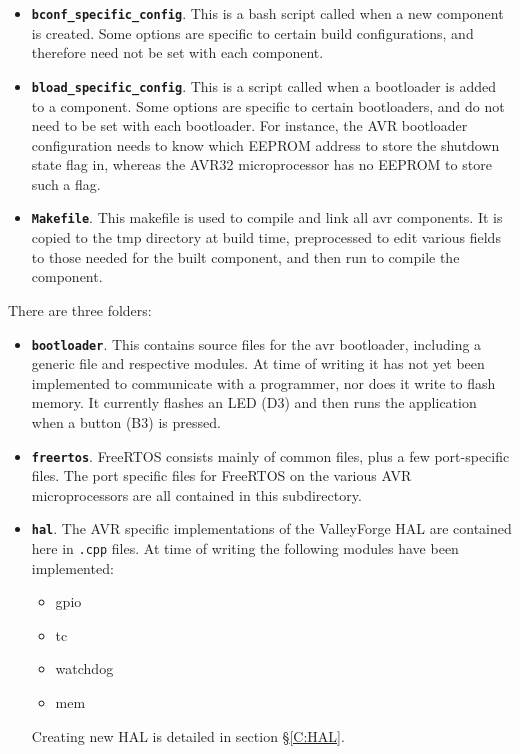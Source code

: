 \documentclass[a4paper, oneside, 11pt, titlepage, onecolumn, openright]{report}
\begin{document}
\begin{itemize}

\item \textbf{\texttt{bconf\_specific\_config}}. This is a bash script called when a new component is created. Some options are specific to certain build configurations, and therefore need not be set with each component. 

\item \textbf{\texttt{bload\_specific\_config}}. This is a script called when a bootloader is added to a component. Some options are specific to certain bootloaders, and do not need to be set with each bootloader. For instance, the AVR bootloader configuration needs to know which EEPROM address to store the shutdown state flag in, whereas the AVR32 microprocessor has no EEPROM to store such a flag.

\item \textbf{\texttt{Makefile}}. This makefile is used to compile and link all avr components. It is copied to the tmp directory at build time, preprocessed to edit various fields to those needed for the built component, and then run to compile the component.

\end{itemize}					

There are three folders:

\begin{itemize}

\item \textbf{\texttt{bootloader}}. This contains source files for the avr bootloader, including a generic file and respective modules. At time of writing it has not yet been implemented to communicate with a programmer, nor does it write to flash memory. It currently flashes an LED (D3) and then runs the application when a button (B3) is pressed.

\item \textbf{\texttt{freertos}}. FreeRTOS consists mainly of common files, plus a few port-specific files. The port specific files for FreeRTOS on the various AVR microprocessors are all contained in this subdirectory.

\item \textbf{\texttt{hal}}. The AVR specific implementations of the ValleyForge HAL are contained here in \texttt{.cpp} files. At time of writing the following modules have been implemented:
\begin{itemize}
\item gpio
\item tc
\item watchdog
\item mem
\end{itemize}

Creating new HAL is detailed in section \S\ref{C:HAL}.

\end{itemize}
\end{document}
